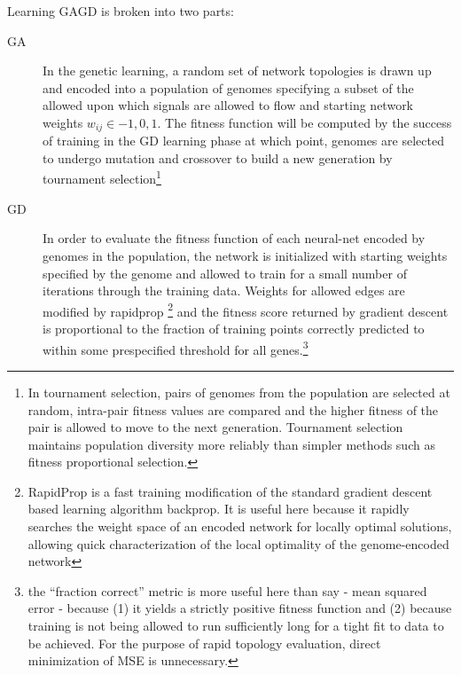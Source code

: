 \documentclass[12pt,a4paper]{article}
\begin{document}
\begin{multicols}{2}
Learning GAGD is broken into two parts:
\begin{description}
\item[GA]{In the genetic learning, a random set of network topologies  is drawn up and encoded into a population of genomes specifying a subset of the allowed upon which signals are allowed to flow and starting network weights $w_{ij} \in {-1,0,1}$. The fitness function will be computed by the success of training in the GD learning phase at which point, genomes are selected to undergo mutation and crossover to build a new generation by tournament selection\footnote{In tournament selection, pairs of genomes from the population are selected at random, intra-pair fitness values are compared and the higher fitness of the pair is allowed to move to the next generation. Tournament selection maintains population diversity more reliably than simpler methods such as fitness proportional selection.}}
\item[GD]{In order to evaluate the fitness function of each neural-net encoded by genomes in the population, the network is initialized with starting weights specified by the genome and allowed to train for a small number of iterations through the training data. Weights for allowed edges are modified by rapidprop \footnote{RapidProp is a fast training modification of the standard gradient descent based learning algorithm backprop. It is useful here because it rapidly searches the weight space of an encoded network for locally optimal solutions, allowing quick characterization of the local optimality of the genome-encoded network} and the fitness score returned by gradient descent is proportional to the fraction of training points correctly predicted to within some prespecified threshold for all genes.\footnote{the ``fraction correct'' metric is more useful here than say - mean squared error - because (1) it yields a strictly positive fitness function and (2) because training is not being allowed to run sufficiently long for a tight fit to data to be achieved. For the purpose of rapid topology evaluation, direct minimization of MSE is unnecessary.}} 
\end{description}


\end{multicols}
\end{document}
